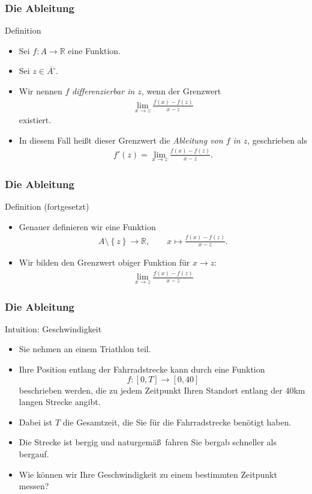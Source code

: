\documentclass{beamer}
\renewcommand{\emph}[1]{{\textcolor{solarizedRed}{\itshape #1}}}
\newcommand\RR{\mathbb R}
\newcommand\cbc[1]{\left\{{#1}\right\}}
\renewcommand{\ae}{\"a}
\renewcommand{\oe}{\"o}
\newcommand{\ue}{\"u}
\newcommand{\mytitle}{Die Ableitung}
\begin{document}
\begin{frame}\frametitle{\mytitle}
	\begin{block}{Definition}
		\begin{itemize}
			\item Sei $f:A\to\RR$ eine Funktion.
			\item Sei $z\in\overline{A^\circ}$.
			\item Wir nennen $f$ \emph{differenzierbar in $z$}, wenn der Grenzwert
				\begin{align*}
					\lim_{x\to z}\frac{f(x)-f(z)}{x-z}
				\end{align*}
				existiert.
			\item In diesem Fall hei\ss t dieser Grenzwert die \emph{Ableitung von $f$ in $z$}, geschrieben als
				\begin{align*}
					f'(z)=\lim_{x\to z}\frac{f(x)-f(z)}{x-z}.
				\end{align*}
		\end{itemize}
	\end{block}
\end{frame}

\begin{frame}\frametitle{\mytitle}
	\begin{block}{Definition (fortgesetzt)}
		\begin{itemize}
			\item Genauer definieren wir eine Funktion 
				\begin{align*}
					A\setminus\cbc z\to\RR,\qquad x\mapsto\frac{f(x)-f(z)}{x-z}.
				\end{align*}
			\item Wir bilden den Grenzwert obiger Funktion f\ue r $x\to z$:
				\begin{align*}
					\lim_{x\to z}\frac{f(x)-f(z)}{x-z}
				\end{align*}
		\end{itemize}
	\end{block}
\end{frame}

\begin{frame}\frametitle{\mytitle}
	\begin{block}{Intuition: Geschwindigkeit}
		\begin{itemize}
			\item Sie nehmen an einem Triathlon teil.
			\item Ihre Position entlang der Fahrradstrecke kann durch eine Funktion $$f:[0,T]\to[0,40]$$
				beschrieben werden, die zu jedem Zeitpunkt Ihren Standort entlang der 40km langen Strecke angibt.
			\item Dabei ist $T$ die Gesamtzeit, die Sie f\ue r die Fahrradstrecke ben\oe tigt haben.
			\item Die Strecke ist bergig und naturgem\ae\ss\ fahren Sie bergab schneller als bergauf.
			\item Wie k\oe nnen wir Ihre Geschwindigkeit \alert{zu einem bestimmten Zeitpunkt} messen?
		\end{itemize}
	\end{block}
\end{frame}
\end{document}
